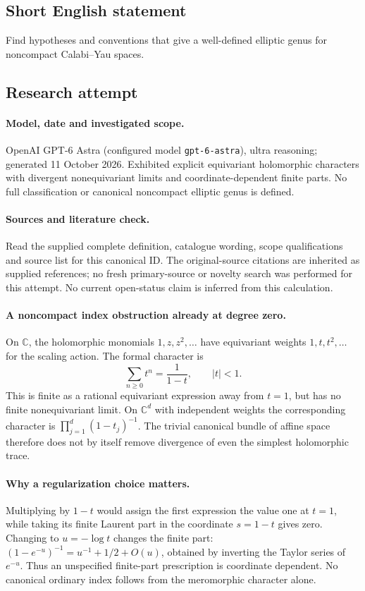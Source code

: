 \documentclass[11pt]{article}
\begin{document}
\subsection{Short English statement}
Find hypotheses and conventions that give a well-defined elliptic genus for noncompact Calabi–Yau spaces.
\subsection{Research attempt}
\paragraph{Model, date and investigated scope.}
OpenAI GPT-6 Astra (configured model \texttt{gpt-6-astra}), ultra reasoning; generated 11 October 2026. Exhibited explicit equivariant holomorphic characters with divergent nonequivariant limits and coordinate-dependent finite parts. No full classification or canonical noncompact elliptic genus is defined.

\paragraph{Sources and literature check.}
Read the supplied complete definition, catalogue wording, scope qualifications and source list for this canonical ID. The original-source citations are inherited as supplied references; no fresh primary-source or novelty search was performed for this attempt. No current open-status claim is inferred from this calculation.

\paragraph{A noncompact index obstruction already at degree zero.}On \(\mathbb C\), the holomorphic monomials \(1,z,z^2,\ldots\) have equivariant weights \(1,t,t^2,\ldots\) for the scaling action. The formal character is
\[\sum_{n\ge0}t^n=\frac1{1-t},\qquad |t|<1.
\]
This is finite as a rational equivariant expression away from \(t=1\), but has no finite nonequivariant limit. On \(\mathbb C^d\) with independent weights the corresponding character is \(\prod_{j=1}^d(1-t_j)^{-1}\). The trivial canonical bundle of affine space therefore does not by itself remove divergence of even the simplest holomorphic trace.
\paragraph{Why a regularization choice matters.}Multiplying by \(1-t\) would assign the first expression the value one at \(t=1\), while taking its finite Laurent part in the coordinate \(s=1-t\) gives zero. Changing to \(u=-\log t\) changes the finite part: \((1-e^{-u})^{-1}=u^{-1}+1/2+O(u)\), obtained by inverting the Taylor series of \(e^{-u}\). Thus an unspecified finite-part prescription is coordinate dependent. No canonical ordinary index follows from the meromorphic character alone.
\end{document}
